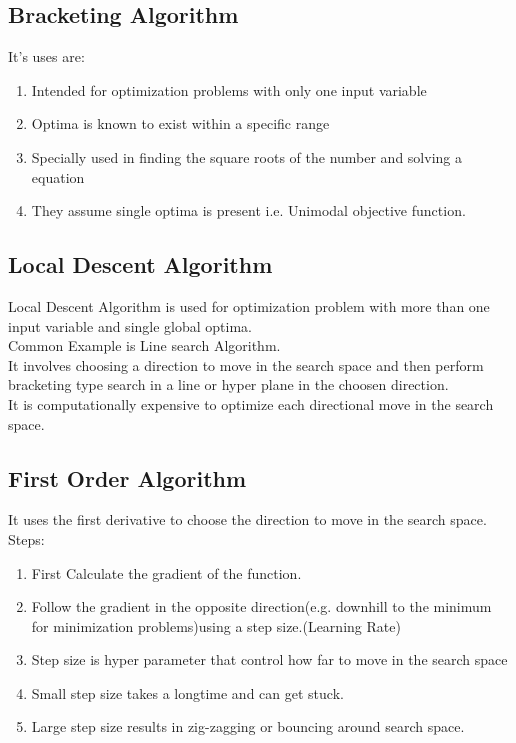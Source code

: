         \subsection{Bracketing Algorithm}
            It's uses are: 
            \begin{enumerate}[label=\alph*.]
                \item Intended for optimization problems with only one input variable
                \item  Optima is known to exist within a specific range
                \item Specially used in finding the square roots of the number and solving a equation
                \item They assume single optima is present i.e. Unimodal objective function. 
            \end{enumerate}
        \subsection{Local Descent Algorithm}
            Local Descent Algorithm is used for optimization problem with more than one input variable and single global optima.\\ 
            Common Example is Line search Algorithm.\\
            It involves choosing a direction to move in the search space and then perform bracketing type search in a line or hyper plane in the choosen direction.\\
            It is computationally expensive to optimize each directional move in the search space.
        \subsection{First Order Algorithm}
            It uses the first derivative to choose the direction to move in the search space.\\
            Steps:
            \begin{enumerate}[label=\alph*.]
                \item First Calculate the gradient of the function.
                \item Follow the gradient in the opposite direction(e.g. downhill to the minimum for minimization problems)using a step size.(Learning Rate) 
                \item Step size is hyper parameter that control how far to move in the search space
                \item Small step size takes a longtime and can get stuck.
                \item Large step size results in zig-zagging or bouncing around search space.
            \end{enumerate} 
